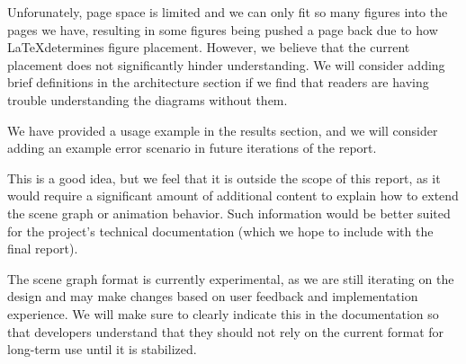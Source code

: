 {
  Unforunately, page space is limited and we can only fit so many figures into the pages we have, resulting in some figures being pushed a page back due to how \LaTeX determines figure placement. However, we believe that the current placement does not significantly hinder understanding. We will consider adding brief definitions in the architecture section if we find that readers are having trouble understanding the diagrams without them.
}

{
  We have provided a usage example in the results section, and we will consider adding an example error scenario in future iterations of the report.
}

{
  This is a good idea, but we feel that it is outside the scope of this report, as it would require a significant amount of additional content to explain how to extend the scene graph or animation behavior. Such information would be better suited for the project's technical documentation (which we hope to include with the final report).
}

{
  The scene graph format is currently experimental, as we are still iterating on the design and may make changes based on user feedback and implementation experience. We will make sure to clearly indicate this in the documentation so that developers understand that they should not rely on the current format for long-term use until it is stabilized.
}

